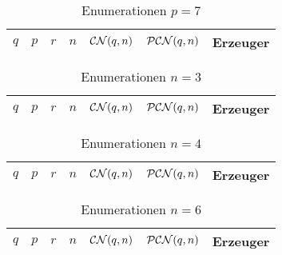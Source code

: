 \begin{longtable}{llllllp{7cm}}
  \caption{Enumerationen $p=7$}\\
  $q$ & $p$ & $r$ & $n$ & $\mathcal{CN}(q,n)$ & $\mathcal{PCN}(q,n)$ & Erzeuger \\\hline
  \endhead
  
\end{longtable}

\begin{longtable}{llllllp{7cm}}
  \caption{Enumerationen $n=3$}\\
  $q$ & $p$ & $r$ & $n$ & $\mathcal{CN}(q,n)$ & $\mathcal{PCN}(q,n)$ & Erzeuger \\\hline
  \endhead
  
\end{longtable}

\begin{longtable}{llllllp{7cm}}
  \caption{Enumerationen $n=4$}\\
  $q$ & $p$ & $r$ & $n$ & $\mathcal{CN}(q,n)$ & $\mathcal{PCN}(q,n)$ & Erzeuger \\\hline
  \endhead
  
\end{longtable}

\begin{longtable}{llllllp{7cm}}
  \caption{Enumerationen $n=6$}\\
  $q$ & $p$ & $r$ & $n$ & $\mathcal{CN}(q,n)$ & $\mathcal{PCN}(q,n)$ & Erzeuger \\\hline
  \endhead
  
\end{longtable}
